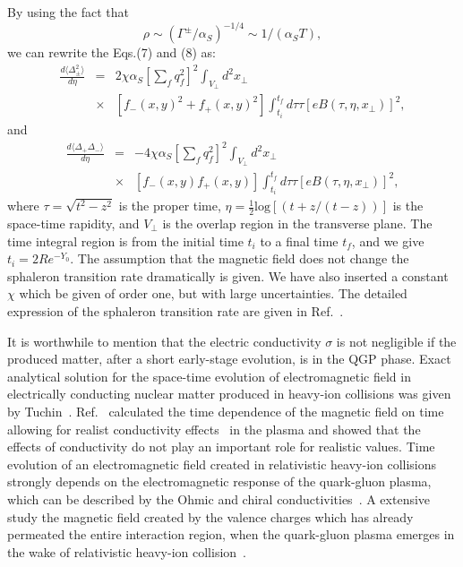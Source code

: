 \documentclass[twocolumn,showpacs,preprintnumbers,amsmath,amssymb]{revtex4}
\begin{document}
By using the fact that
\begin{equation}
\rho\sim(\Gamma^{\pm}/\alpha_{S})^{-1/4}\sim1/(\alpha_{S}T),
\label{eq:eq10} %
\end{equation}
we can rewrite the Eqs.(7) and (8) as:
\begin{eqnarray}
\frac{d\langle\Delta_{\pm}^{2}\rangle}{d\eta}&=&2\chi\alpha_{S}[\sum_{f}q_{f}^{2}]^{2}\int_{V_{\perp}}d^{2}x_{\perp}\\
&\times&[f_{-}(x,y)^{2}+f_{+}(x,y)^{2}]\int_{t_{i}}^{t_{f}}d\tau\tau[eB(\tau,\eta,x_{\perp})]^{2}\nonumber,
\label{eq:eq11} %
\end{eqnarray}
and
\begin{eqnarray}
\frac{d\langle \Delta_{+}\Delta_{-}\rangle}{d\eta}&=&-4\chi\alpha_{S}[\sum_{f}q_{f}^{2}]^{2}\int_{V_{\perp}}d^{2}x_{\perp}\\
&\times&[f_{-}(x,y)f_{+}(x,y)]\int_{t_{i}}^{t_{f}}d\tau\tau[eB(\tau,\eta,x_{\perp})]^{2}\nonumber,
\label{eq:eq12} %
\end{eqnarray}
where $\tau=\sqrt{t^{2}-z^{2}}$ is the proper time, $\eta=\frac{1}{2}\textrm{log}[(t+z/(t-z))]$ is the space-time rapidity,
and $V_{\perp}$ is the overlap region  in the transverse plane. The time integral region is
from the initial time $t_{i}$  to a final time $t_{f}$, and we give $t_{i}=2Re^{-Y_{0}}$.
The assumption that the magnetic field does not change the sphaleron transition rate dramatically is given. We have also inserted a constant $\chi$ which
be given of order one, but with large uncertainties. The detailed expression of the sphaleron transition rate are given in Ref.~\cite{lab7}.

It is worthwhile to mention that the electric
conductivity $\sigma$ is not negligible if the produced matter, after a short
early-stage evolution, is in the QGP phase. Exact analytical solution for the space-time evolution of electromagnetic field in electrically conducting nuclear
matter produced in heavy-ion collisions was given by Tuchin~\cite{lab17, lab18}.  Ref.~\cite{lab19}  calculated the time dependence of the magnetic field on time allowing for
realist conductivity effects~\cite{lab26} in the plasma and showed that the effects of conductivity do not play an important role for realistic values.
Time evolution of an electromagnetic field created in relativistic heavy-ion collisions strongly depends on the electromagnetic response of the quark-gluon plasma,
which can be described by the Ohmic and chiral
conductivities~\cite{lab20}. A extensive study the magnetic field created by the valence charges which has already permeated
the entire interaction region, when the quark-gluon plasma
emerges in the wake of relativistic heavy-ion collision~\cite{lab21}.
\end{document}
